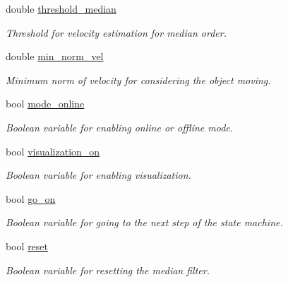\begin{DoxyCompactItemize}
\mbox{\label{classSuperqModule_a226a730b20160c8e6483bd3b1064a7bc}} 
double \mbox{\hyperlink{classSuperqModule_a226a730b20160c8e6483bd3b1064a7bc}{threshold\+\_\+median}}
\begin{DoxyCompactList}\small\item\em Threshold for velocity estimation for median order. \end{DoxyCompactList}\item 
\mbox{\label{classSuperqModule_ace8ceaaf035427634c78f3d720ab2432}} 
double \mbox{\hyperlink{classSuperqModule_ace8ceaaf035427634c78f3d720ab2432}{min\+\_\+norm\+\_\+vel}}
\begin{DoxyCompactList}\small\item\em Minimum norm of velocity for considering the object moving. \end{DoxyCompactList}\item 
\mbox{\label{classSuperqModule_adfab63f5b7aad436d9833898ea23602a}} 
bool \mbox{\hyperlink{classSuperqModule_adfab63f5b7aad436d9833898ea23602a}{mode\+\_\+online}}
\begin{DoxyCompactList}\small\item\em Boolean variable for enabling online or offline mode. \end{DoxyCompactList}\item 
\mbox{\label{classSuperqModule_aecdc7d85514cc472b7a91982d6b1f58d}} 
bool \mbox{\hyperlink{classSuperqModule_aecdc7d85514cc472b7a91982d6b1f58d}{visualization\+\_\+on}}
\begin{DoxyCompactList}\small\item\em Boolean variable for enabling visualization. \end{DoxyCompactList}\item 
\mbox{\label{classSuperqModule_a46bddbc5530c3086005ad07281bc5ae9}} 
bool \mbox{\hyperlink{classSuperqModule_a46bddbc5530c3086005ad07281bc5ae9}{go\+\_\+on}}
\begin{DoxyCompactList}\small\item\em Boolean variable for going to the next step of the state machine. \end{DoxyCompactList}\item 
\mbox{\label{classSuperqModule_ad3f77b480fd86b554fabf882c090ddc1}} 
bool \mbox{\hyperlink{classSuperqModule_ad3f77b480fd86b554fabf882c090ddc1}{reset}}
\begin{DoxyCompactList}\small\item\em Boolean variable for resetting the median filter. \end{DoxyCompactList}\item 

\end{DoxyCompactItemize}
